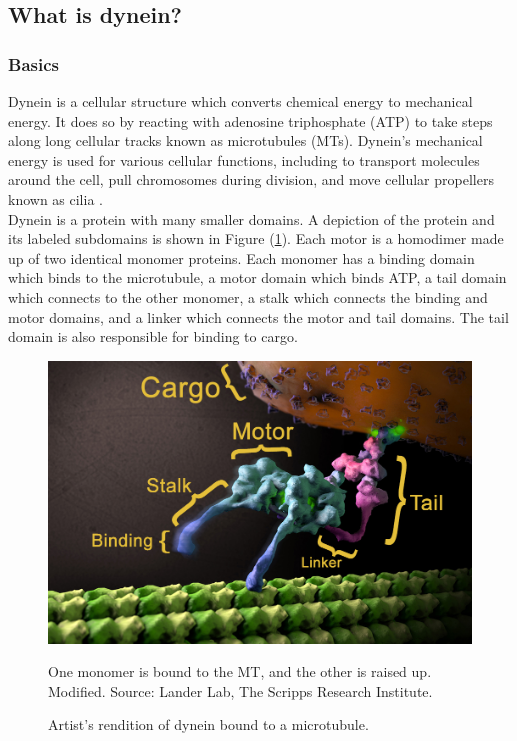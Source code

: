 \documentclass[10pt]{article} %
\begin{document}


\subsection{What is dynein?}
\subsubsection{Basics}
Dynein is a cellular structure which converts chemical energy to mechanical energy. It does so by reacting with adenosine triphosphate (ATP) to take steps along long cellular tracks known as microtubules (MTs). Dynein's mechanical energy is used for various cellular functions, including to transport molecules around the cell, pull chromosomes during division, and move cellular propellers known as cilia \cite{cianfroccoreview}.\\

Dynein is a protein with many smaller domains. A depiction of the protein and its labeled subdomains is shown in Figure (\ref{dynein-artist-rendition}). Each motor is a homodimer made up of two identical monomer proteins. Each monomer has a binding domain which binds to the microtubule, a motor domain which binds ATP, a tail domain which connects to the other monomer, a stalk which connects the binding and motor domains, and a linker which connects the motor and tail domains. The tail domain is also responsible for binding to cargo.\\

\begin{figure}[h]
  \centering
  \includegraphics[width=.65\textwidth,keepaspectratio]{../../figures/dynein-artist-rendition.jpg}
  \caption{Artist's rendition of dynein bound to a microtubule.}{One monomer is bound to the MT, and the other is raised up. Modified. Source: Lander Lab, The Scripps Research Institute.}
  \label{dynein-artist-rendition}
\end{figure}
\end{document}
